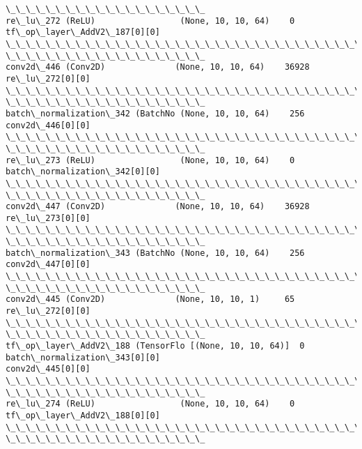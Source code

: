 \documentclass[11pt]{article}
\begin{document}
\begin{Verbatim}[commandchars=\\\{\}]
\_\_\_\_\_\_\_\_\_\_\_\_\_\_\_\_\_\_\_\_
re\_lu\_272 (ReLU)                 (None, 10, 10, 64)    0
tf\_op\_layer\_AddV2\_187[0][0]
\_\_\_\_\_\_\_\_\_\_\_\_\_\_\_\_\_\_\_\_\_\_\_\_\_\_\_\_\_\_\_\_\_\_\_\_\_\_\_\_\_\_\_\_\_\_\_\_\_\_\_\_\_\_\_\_\_\_\_\_\_\_\_\_\_\_\_\_\_\_\_\_\_\_\_\_\_\_\_\_
\_\_\_\_\_\_\_\_\_\_\_\_\_\_\_\_\_\_\_\_
conv2d\_446 (Conv2D)              (None, 10, 10, 64)    36928
re\_lu\_272[0][0]
\_\_\_\_\_\_\_\_\_\_\_\_\_\_\_\_\_\_\_\_\_\_\_\_\_\_\_\_\_\_\_\_\_\_\_\_\_\_\_\_\_\_\_\_\_\_\_\_\_\_\_\_\_\_\_\_\_\_\_\_\_\_\_\_\_\_\_\_\_\_\_\_\_\_\_\_\_\_\_\_
\_\_\_\_\_\_\_\_\_\_\_\_\_\_\_\_\_\_\_\_
batch\_normalization\_342 (BatchNo (None, 10, 10, 64)    256
conv2d\_446[0][0]
\_\_\_\_\_\_\_\_\_\_\_\_\_\_\_\_\_\_\_\_\_\_\_\_\_\_\_\_\_\_\_\_\_\_\_\_\_\_\_\_\_\_\_\_\_\_\_\_\_\_\_\_\_\_\_\_\_\_\_\_\_\_\_\_\_\_\_\_\_\_\_\_\_\_\_\_\_\_\_\_
\_\_\_\_\_\_\_\_\_\_\_\_\_\_\_\_\_\_\_\_
re\_lu\_273 (ReLU)                 (None, 10, 10, 64)    0
batch\_normalization\_342[0][0]
\_\_\_\_\_\_\_\_\_\_\_\_\_\_\_\_\_\_\_\_\_\_\_\_\_\_\_\_\_\_\_\_\_\_\_\_\_\_\_\_\_\_\_\_\_\_\_\_\_\_\_\_\_\_\_\_\_\_\_\_\_\_\_\_\_\_\_\_\_\_\_\_\_\_\_\_\_\_\_\_
\_\_\_\_\_\_\_\_\_\_\_\_\_\_\_\_\_\_\_\_
conv2d\_447 (Conv2D)              (None, 10, 10, 64)    36928
re\_lu\_273[0][0]
\_\_\_\_\_\_\_\_\_\_\_\_\_\_\_\_\_\_\_\_\_\_\_\_\_\_\_\_\_\_\_\_\_\_\_\_\_\_\_\_\_\_\_\_\_\_\_\_\_\_\_\_\_\_\_\_\_\_\_\_\_\_\_\_\_\_\_\_\_\_\_\_\_\_\_\_\_\_\_\_
\_\_\_\_\_\_\_\_\_\_\_\_\_\_\_\_\_\_\_\_
batch\_normalization\_343 (BatchNo (None, 10, 10, 64)    256
conv2d\_447[0][0]
\_\_\_\_\_\_\_\_\_\_\_\_\_\_\_\_\_\_\_\_\_\_\_\_\_\_\_\_\_\_\_\_\_\_\_\_\_\_\_\_\_\_\_\_\_\_\_\_\_\_\_\_\_\_\_\_\_\_\_\_\_\_\_\_\_\_\_\_\_\_\_\_\_\_\_\_\_\_\_\_
\_\_\_\_\_\_\_\_\_\_\_\_\_\_\_\_\_\_\_\_
conv2d\_445 (Conv2D)              (None, 10, 10, 1)     65
re\_lu\_272[0][0]
\_\_\_\_\_\_\_\_\_\_\_\_\_\_\_\_\_\_\_\_\_\_\_\_\_\_\_\_\_\_\_\_\_\_\_\_\_\_\_\_\_\_\_\_\_\_\_\_\_\_\_\_\_\_\_\_\_\_\_\_\_\_\_\_\_\_\_\_\_\_\_\_\_\_\_\_\_\_\_\_
\_\_\_\_\_\_\_\_\_\_\_\_\_\_\_\_\_\_\_\_
tf\_op\_layer\_AddV2\_188 (TensorFlo [(None, 10, 10, 64)]  0
batch\_normalization\_343[0][0]
conv2d\_445[0][0]
\_\_\_\_\_\_\_\_\_\_\_\_\_\_\_\_\_\_\_\_\_\_\_\_\_\_\_\_\_\_\_\_\_\_\_\_\_\_\_\_\_\_\_\_\_\_\_\_\_\_\_\_\_\_\_\_\_\_\_\_\_\_\_\_\_\_\_\_\_\_\_\_\_\_\_\_\_\_\_\_
\_\_\_\_\_\_\_\_\_\_\_\_\_\_\_\_\_\_\_\_
re\_lu\_274 (ReLU)                 (None, 10, 10, 64)    0
tf\_op\_layer\_AddV2\_188[0][0]
\_\_\_\_\_\_\_\_\_\_\_\_\_\_\_\_\_\_\_\_\_\_\_\_\_\_\_\_\_\_\_\_\_\_\_\_\_\_\_\_\_\_\_\_\_\_\_\_\_\_\_\_\_\_\_\_\_\_\_\_\_\_\_\_\_\_\_\_\_\_\_\_\_\_\_\_\_\_\_\_
\_\_\_\_\_\_\_\_\_\_\_\_\_\_\_\_\_\_\_\_

\end{Verbatim}
\end{document}
